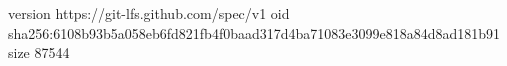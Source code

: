version https://git-lfs.github.com/spec/v1
oid sha256:6108b93b5a058eb6fd821fb4f0baad317d4ba71083e3099e818a84d8ad181b91
size 87544
